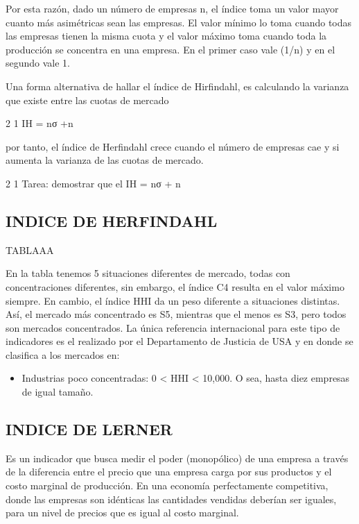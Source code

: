 \documentclass[
  letterpaper,
  DIV=11,
  numbers=noendperiod]{scrartcl}
\providecommand{\tightlist}{%
  \setlength{\itemsep}{0pt}\setlength{\parskip}{0pt}}\usepackage{longtable,booktabs,array}
\begin{document}
Por esta razón, dado un número de empresas n, el índice toma un valor
mayor cuanto más asimétricas sean las empresas. El valor mínimo lo toma
cuando todas las empresas tienen la misma cuota y el valor máximo toma
cuando toda la producción se concentra en una empresa. En el primer caso
vale (1/n) y en el segundo vale 1.

Una forma alternativa de hallar el índice de Hirfindahl, es calculando
la varianza que existe entre las cuotas de mercado

2 1 IH = nσ +n

por tanto, el índice de Herfindahl crece cuando el número de empresas
cae y si aumenta la varianza de las cuotas de mercado.

2 1 Tarea: demostrar que el IH = nσ + n

\hypertarget{indice-de-herfindahl}{%
\subsection{INDICE DE HERFINDAHL}\label{indice-de-herfindahl}}

TABLAAA

En la tabla tenemos 5 situaciones diferentes de mercado, todas con
concentraciones diferentes, sin embargo, el índice C4 resulta en el
valor máximo siempre. En cambio, el índice HHI da un peso diferente a
situaciones distintas. Así, el mercado más concentrado es S5, mientras
que el menos es S3, pero todos son mercados concentrados. La única
referencia internacional para este tipo de indicadores es el realizado
por el Departamento de Justicia de USA y en donde se clasifica a los
mercados en:

\begin{itemize}
\tightlist
\item
  Industrias poco concentradas: 0 \textless{} HHI \textless{} 10,000. O
  sea, hasta diez empresas de igual tamaño.
\end{itemize}

\hypertarget{indice-de-lerner}{%
\subsection{INDICE DE LERNER}\label{indice-de-lerner}}

Es un indicador que busca medir el poder (monopólico) de una empresa a
través de la diferencia entre el precio que una empresa carga por sus
productos y el costo marginal de producción. En una economía
perfectamente competitiva, donde las empresas son idénticas las
cantidades vendidas deberían ser iguales, para un nivel de precios que
es igual al costo marginal.
\end{document}
